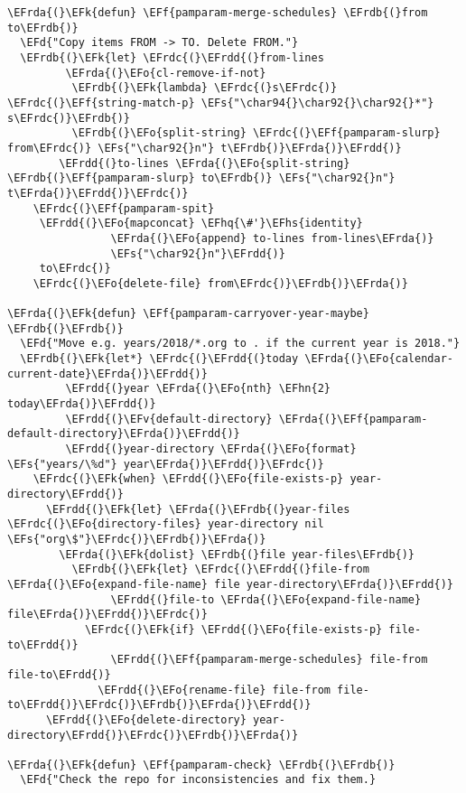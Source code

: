 \documentclass[a4wide,10pt]{article}
\newcommand{\EFs}[1]{\textcolor{EFs}{#1}} %
\newcommand{\EFd}[1]{\textcolor{EFd}{#1}} %
\newcommand{\EFk}[1]{\textcolor{EFk}{#1}} %
\newcommand{\EFf}[1]{\textcolor{EFf}{#1}} %
\newcommand{\EFv}[1]{\textcolor{EFv}{#1}} %
\newcommand{\EFo}[1]{\textcolor{EFo}{#1}} %
\newcommand{\EFhn}[1]{\textcolor{EFhn}{\textbf{#1}}} %
\newcommand{\EFhq}[1]{\textcolor{EFhq}{#1}} %
\newcommand{\EFhs}[1]{\textcolor{EFhs}{#1}} %
\newcommand{\EFrda}[1]{\textcolor{EFrda}{#1}} %
\newcommand{\EFrdb}[1]{\textcolor{EFrdb}{#1}} %
\newcommand{\EFrdc}[1]{\textcolor{EFrdc}{#1}} %
\newcommand{\EFrdd}[1]{\textcolor{EFrdd}{#1}} %
\begin{document}
\begin{Code}
\begin{Verbatim}
\EFrda{(}\EFk{defun} \EFf{pamparam-merge-schedules} \EFrdb{(}from to\EFrdb{)}
  \EFd{"Copy items FROM -> TO. Delete FROM."}
  \EFrdb{(}\EFk{let} \EFrdc{(}\EFrdd{(}from-lines
         \EFrda{(}\EFo{cl-remove-if-not}
          \EFrdb{(}\EFk{lambda} \EFrdc{(}s\EFrdc{)} \EFrdc{(}\EFf{string-match-p} \EFs{"\char94{}\char92{}\char92{}*"} s\EFrdc{)}\EFrdb{)}
          \EFrdb{(}\EFo{split-string} \EFrdc{(}\EFf{pamparam-slurp} from\EFrdc{)} \EFs{"\char92{}n"} t\EFrdb{)}\EFrda{)}\EFrdd{)}
        \EFrdd{(}to-lines \EFrda{(}\EFo{split-string} \EFrdb{(}\EFf{pamparam-slurp} to\EFrdb{)} \EFs{"\char92{}n"} t\EFrda{)}\EFrdd{)}\EFrdc{)}
    \EFrdc{(}\EFf{pamparam-spit}
     \EFrdd{(}\EFo{mapconcat} \EFhq{\#'}\EFhs{identity}
                \EFrda{(}\EFo{append} to-lines from-lines\EFrda{)}
                \EFs{"\char92{}n"}\EFrdd{)}
     to\EFrdc{)}
    \EFrdc{(}\EFo{delete-file} from\EFrdc{)}\EFrdb{)}\EFrda{)}

\EFrda{(}\EFk{defun} \EFf{pamparam-carryover-year-maybe} \EFrdb{(}\EFrdb{)}
  \EFd{"Move e.g. years/2018/*.org to . if the current year is 2018."}
  \EFrdb{(}\EFk{let*} \EFrdc{(}\EFrdd{(}today \EFrda{(}\EFo{calendar-current-date}\EFrda{)}\EFrdd{)}
         \EFrdd{(}year \EFrda{(}\EFo{nth} \EFhn{2} today\EFrda{)}\EFrdd{)}
         \EFrdd{(}\EFv{default-directory} \EFrda{(}\EFf{pamparam-default-directory}\EFrda{)}\EFrdd{)}
         \EFrdd{(}year-directory \EFrda{(}\EFo{format} \EFs{"years/\%d"} year\EFrda{)}\EFrdd{)}\EFrdc{)}
    \EFrdc{(}\EFk{when} \EFrdd{(}\EFo{file-exists-p} year-directory\EFrdd{)}
      \EFrdd{(}\EFk{let} \EFrda{(}\EFrdb{(}year-files \EFrdc{(}\EFo{directory-files} year-directory nil \EFs{"org\$"}\EFrdc{)}\EFrdb{)}\EFrda{)}
        \EFrda{(}\EFk{dolist} \EFrdb{(}file year-files\EFrdb{)}
          \EFrdb{(}\EFk{let} \EFrdc{(}\EFrdd{(}file-from \EFrda{(}\EFo{expand-file-name} file year-directory\EFrda{)}\EFrdd{)}
                \EFrdd{(}file-to \EFrda{(}\EFo{expand-file-name} file\EFrda{)}\EFrdd{)}\EFrdc{)}
            \EFrdc{(}\EFk{if} \EFrdd{(}\EFo{file-exists-p} file-to\EFrdd{)}
                \EFrdd{(}\EFf{pamparam-merge-schedules} file-from file-to\EFrdd{)}
              \EFrdd{(}\EFo{rename-file} file-from file-to\EFrdd{)}\EFrdc{)}\EFrdb{)}\EFrda{)}\EFrdd{)}
      \EFrdd{(}\EFo{delete-directory} year-directory\EFrdd{)}\EFrdc{)}\EFrdb{)}\EFrda{)}

\EFrda{(}\EFk{defun} \EFf{pamparam-check} \EFrdb{(}\EFrdb{)}
  \EFd{"Check the repo for inconsistencies and fix them.}


\end{Verbatim}
\end{Code}
\end{document}
